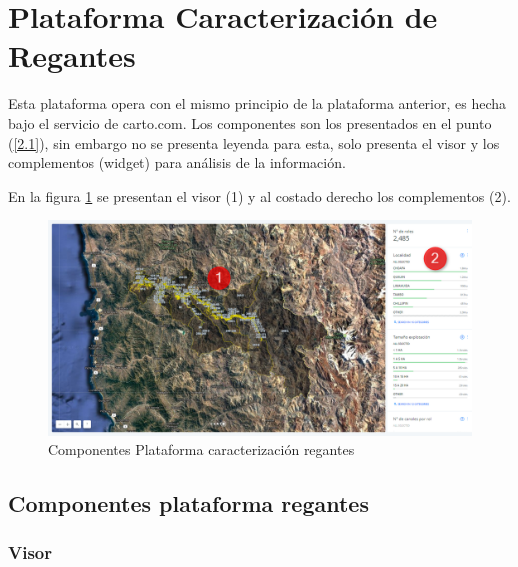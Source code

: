 \documentclass[10pt]{article}
\begin{document}
\newpage

\section{Plataforma Caracterización de Regantes}

Esta plataforma opera con el mismo principio de la plataforma anterior, es hecha bajo el servicio de carto.com. Los componentes son los presentados en el punto (\ref{2.1}), sin embargo no se presenta leyenda para esta, solo presenta el visor y los complementos (widget) para análisis de la información.\bigskip\setlength{\parindent}{0pt}

En la figura \ref{9} se presentan el visor (1) y al costado derecho los complementos (2).

\begin{figure}[H]
\centering
\includegraphics[scale=0.5]{Figuras_manual/componentes_regantes2.png}
\caption{Componentes Plataforma caracterización regantes}
\label{9}
\end{figure}

\subsection{Componentes plataforma regantes}

\subsubsection{Visor}
\end{document}
